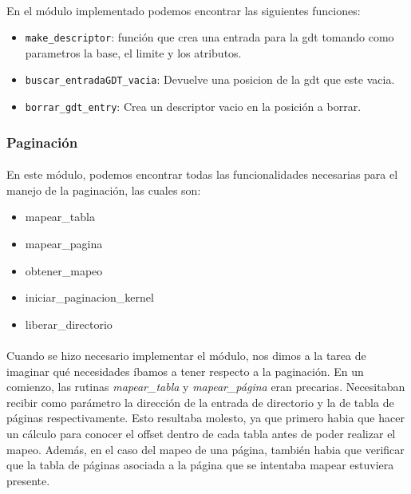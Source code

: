 \documentclass[11pt, a4paper]{article}
\begin{document}
	\paragraph{}
	En el módulo implementado podemos encontrar las siguientes funciones:

	\begin{itemize}
		\item \texttt{make\_descriptor}: función que crea una entrada para la gdt tomando como parametros la base, el limite y los atributos.
		\item \texttt{buscar\_entradaGDT\_vacia}: Devuelve una posicion de la gdt que este vacia.
		\item \texttt{borrar\_gdt\_entry}: Crea un descriptor vacio en la posición a borrar.
	\end{itemize}

\subsubsection{Paginación}
	\paragraph{}
	En este módulo, podemos encontrar todas las funcionalidades necesarias para el manejo de la paginación, las cuales son:
	
	\begin{itemize}
		\item mapear\_tabla
		\item mapear\_pagina
		\item obtener\_mapeo
		\item iniciar\_paginacion\_kernel
		\item liberar\_directorio
	\end{itemize}

	\paragraph{}
	Cuando se hizo necesario implementar el módulo, nos dimos a la tarea de imaginar qué necesidades íbamos a tener respecto a la paginación. En un comienzo, las rutinas \textit{mapear\_tabla} y \textit{mapear\_página} eran precarias. Necesitaban recibir como parámetro la dirección de la entrada de directorio y la de tabla de páginas respectivamente. Esto resultaba molesto, ya que primero habia que hacer un cálculo para conocer el offset dentro de cada tabla antes de poder realizar el mapeo. Además, en el caso del mapeo de una página, también habia que verificar que la tabla de páginas asociada a la página que se intentaba mapear estuviera presente.
\end{document}
